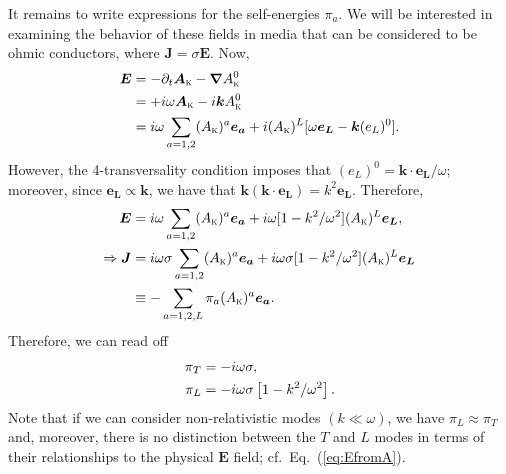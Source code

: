 \documentclass[amsmath,amssymb,aps,10pt,prd,letterpaper,nofootinbib,balancelastpage,notitlepage,superscriptaddress,twocolumn,floatfix]{revtex4-2}
\renewcommand{\eqref}[2][]{Eq{#1}.~(\ref{eq:#2})}	%
\newcommand{\lb}{\ensuremath{\left}}					%
\newcommand{\rb}{\ensuremath{\right}}					%
\newcommand{\kin}[1]{({#1}_{\textsc{k}})}
\begin{document}
It remains to write expressions for the self-energies $\pi_a$. 
We will be interested in examining the behavior of these fields in media that can be considered to be ohmic conductors, where $\bm{J} = \sigma \bm{E}$.
Now,
\begin{align}
    \bm{E} &= - \partial_t \bm{A}_{\textsc{k}} - \bm{\nabla} A_{\textsc{k}}^0 \\
           &= +i \omega \bm{A}_{\textsc{k}} -i\bm{k} A_{\textsc{k}}^0 \\
           &= i\omega \sum_{a=1,2} \kin{A}^a \bm{e_a} + i \kin{A}^L [ \omega \bm{e_L} - \bm{k}(e_L)^0 ].
\end{align}
However, the 4-transversality condition imposes that $(e_L)^0 = \bm{k} \cdot \bm{e_L} / \omega$; moreover, since $\bm{e_L}\propto \bm{k}$, we have that $\bm{k} ( \bm{k} \cdot \bm{e_L} ) = k^2 \bm{e_L}$.
Therefore,
\begin{align}
    \bm{E} &= i\omega \sum_{a=1,2} \kin{A}^a \bm{e_a} + i \omega  [ 1 -  k^2 / \omega^2  ] \kin{A}^L \bm{e_L}, \label{eq:EfromA}\\
\Rightarrow \bm{J} &= i\omega\sigma \sum_{a=1,2} \kin{A}^a \bm{e_a} + i \omega \sigma  [ 1 -  k^2 / \omega^2  ] \kin{A}^L \bm{e_L} \\
    &\equiv - \sum_{a=1,2,L} \pi_a \kin{A}^a \bm{e_a}.
\end{align}
Therefore, we can read off 
\begin{align}
    \pi_T &= - i \omega \sigma, \label{eq:sigmaT} \\
    \pi_L &= - i \omega \sigma \lb[ 1 - k^2 / \omega^2 \rb].\label{eq:sigmaL}
\end{align}
Note that if we can consider non-relativistic modes $(k\ll \omega)$, we have $\pi_L \approx \pi_T$ and, moreover, there is no distinction between the $T$ and $L$ modes in terms of their relationships to the physical $\bm{E}$ field; cf.~\eqref{EfromA}.
\end{document}
